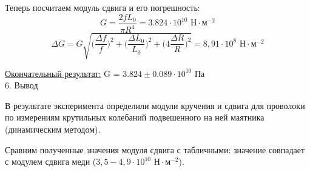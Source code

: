 \documentclass[12pt, a4paper]{article}
\begin{document}
Теперь посчитаем модуль сдвига и его погрешность:
\[G = \frac{2fL_0}{\pi R^4} = 3.824 \cdot 10^{10}\text{ Н} \cdot \text{м}^{-2}\] 
\[\Delta G = G \sqrt{\Big( \frac{\Delta f}{f}\Big) ^2 + \Big(\frac{\Delta L_0}{L_0} \Big)^2 + \Big(4\frac{\Delta R}{R} \Big)^2}= 8,91 \cdot 10^8 \text{ Н} \cdot \text{м}^{-2}\]

    \underline{Окончательный результат:} G = $3.824 \pm 0.089 \cdot 10^{10}$ Па \\ 


    \vspace*{0.3cm}
    {\Large 6. Вывод \\} 

В результате эксперимента определили модули кручения и сдвига для проволоки по измерениям крутильных колебаний подвешенного на ней маятника (динамическим методом). 

Сравним полученные значения модуля сдвига с табличными: значение совпадает с модулем сдвига меди ($3,5-4,9 \cdot 10^{10}\text{ Н} \cdot \text{м}^{-2}$).
\end{document}
